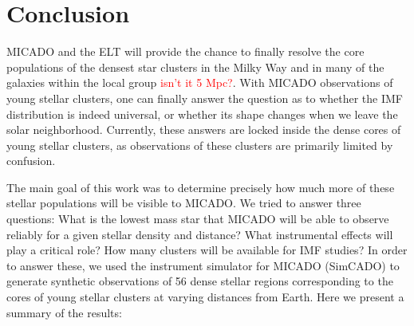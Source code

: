 \section{Conclusion}
\label{sec:conclusion}

MICADO and the ELT will provide the chance to finally resolve the core populations of the densest star clusters in the Milky Way and in many of the galaxies within the local group \textcolor{red}{isn't it 5 Mpc?}.  With MICADO observations of young stellar clusters, one can finally answer the question as to whether the IMF distribution is indeed universal, or whether its shape changes when we leave the solar neighborhood. Currently, these answers are locked inside the dense cores of young stellar clusters, as observations of these clusters are primarily limited by confusion.

The main goal of this work was to determine precisely how much more of these stellar populations will be visible to MICADO. We tried to answer three questions: What is the lowest mass star that MICADO will be able to observe reliably for a given stellar density and distance? What instrumental effects will play a critical role? How many clusters will be available for IMF studies? In order to answer these, we used the instrument simulator for MICADO (SimCADO) to generate synthetic observations of 56 dense stellar regions corresponding to the cores of young stellar clusters at varying distances from Earth. Here we present a summary of the results:


